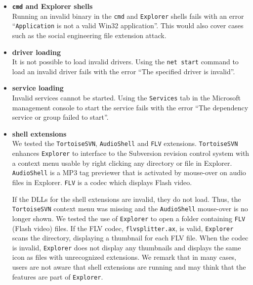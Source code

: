 \begin{itemize}
\item{\bf {\tt cmd} and Explorer shells} \\
Running an invalid binary in the
{\tt cmd} and {\tt Explorer} shells fails with an
error
``{\tt Application} is not a valid Win32 application''.
This would also cover cases such as the social engineering file extension
attack.

\item{\bf driver loading} \\
It is not possible to load invalid drivers.
Using the {\tt net start} command to load an invalid driver
fails with the error ``The specified driver is invalid''.

\item{\bf service loading} \\
Invalid services cannot be started.
Using the {\tt Services} tab in the Microsoft management console
to start the service
fails with the error ``The dependency service or group failed to start''.

\item {\bf shell extensions} \\
We tested the {\tt Tortoise\-SVN}, {\tt AudioShell} and {\tt FLV} extensions.
{\tt TortoiseSVN} enhances {\tt Explorer} to
interface to the Subversion revision control system with
a context menu usable by right clicking any
directory or file in Explorer.
{\tt AudioShell} is a MP3 tag previewer that is activated by mouse-over
on audio files in Explorer.
{\tt FLV} is a codec which displays Flash video.

If the DLLs for the shell extensions are invalid, they do not load.
Thus, the {\tt TortoiseSVN} context menu was missing and
the {\tt AudioShell} mouse-over is no longer shown.
We tested the use of {\tt Explorer} to open a folder containing
{\tt FLV} (Flash video) files. If the FLV codec, {\tt flvsplitter.ax},
is valid, {\tt Explorer} scans the directory, displaying a thumbnail
for each FLV file. When the codec is invalid,
{\tt Explorer} does not display any thumbnails and displays the same
icon as files with unrecognized extensions.
We remark that in many cases, users are not
aware that shell extensions are running and may think that the features
are part of {\tt Explorer}.


\end{itemize}
